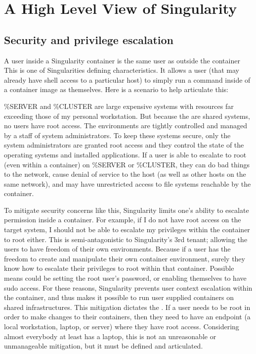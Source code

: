 \documentclass[letterpaper,10pt,english]{sphinxmanual}
\begin{document}
\section{A High Level View of Singularity}
\label{\detokenize{introduction:a-high-level-view-of-singularity}}

\subsection{Security and privilege escalation}
\label{\detokenize{introduction:security-and-privilege-escalation}}\label{\detokenize{introduction:id1}}
A user inside a Singularity container
is the same user as outside the container
This is one of Singularities defining characteristics. It allows a
user (that may already have shell access to a particular host) to
simply run a command inside of a container image as themselves. Here
is a scenario to help articulate this:

\%SERVER and \%CLUSTER are large expensive systems with resources far
exceeding those of my personal workstation. But because the are
shared systems, no users have root access. The environments are
tightly controlled and managed by a staff of system administrators.
To keep these systems secure, only the system administrators are
granted root access and they control the state of the operating
systems and installed applications. If a user is able to escalate to
root (even within a container) on \%SERVER or \%CLUSTER, they can do
bad things to the network, cause denial of service to the host (as
well as other hosts on the same network), and may have unrestricted
access to file systems reachable by the container.

To mitigate security concerns like this, Singularity limits one’s
ability to escalate permission inside a container. For example, if I
do not have root access on the target system, I should not be able to
escalate my privileges within the container to root either. This is
semi-antagonistic to Singularity’s 3rd tenant; allowing the users to
have freedom of their own environments. Because if a user has the
freedom to create and manipulate their own container environment,
surely they know how to escalate their privileges to root within that
container. Possible means could be setting the root user’s password,
or enabling themselves to have sudo access. For these reasons,
Singularity prevents user context escalation within the container, and
thus makes it possible to run user supplied containers on shared
infrastructures.
This mitigation dictates the {\hyperref[\detokenize{singularity_flow:singularity-flow}]{}}. If a user needs to be root
in order to make changes to their containers, then they need to have
an endpoint (a local workstation, laptop, or server) where they have
root access. Considering almost everybody at least has a laptop, this
is not an unreasonable or unmanageable mitigation, but it must be
defined and articulated.
\end{document}
